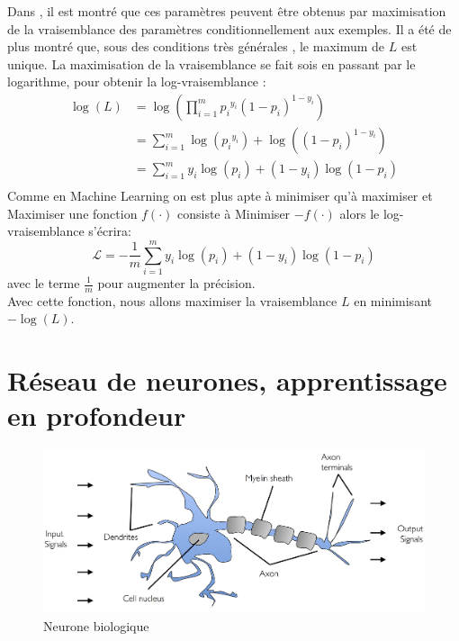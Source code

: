 	Dans \cite{antoine2018apprentissage}, il est montré que ces paramètres peuvent être obtenus par maximisation de la vraisemblance des paramètres conditionnellement aux exemples. Il a été de plus montré que, sous des conditions très générales \cite{sarkar2017practical}, le maximum de $L$ est unique.
	La maximisation de la vraisemblance se fait sois en passant par le logarithme, pour obtenir la log-vraisemblance :
	\begin{equation}
		\begin{split}
			\log(L)  & = \log(\prod_{i=1}^{m} {p_i}^{y_i} (1-p_i)^{1-y_i}) \\
			& =\sum_{i=1}^{m} \log( {p_i}^{y_i}) +\log((1-p_i)^{1-y_i})\\
			& =\sum_{i=1}^{m} {y_i}\log( {p_i}) +{(1-y_i)}\log(1-p_i)\\
		\end{split}
	\end{equation}
	Comme en Machine Learning on est plus apte à minimiser qu'à maximiser et Maximiser une fonction $f(\cdot)$ consiste à Minimiser $-f(\cdot)$ alors le log-vraisemblance s'écrira: 
	\begin{equation}\label{eq:log-likelyhood}
		\mathcal{L} = -\frac{1}{m}\sum_{i=1}^{m} {y_i}\log( {p_i}) +{(1-y_i)}\log(1-p_i)
	\end{equation}
	avec le terme $\frac{1}{m}$ pour augmenter la précision.\\
	Avec cette fonction, nous allons maximiser la vraisemblance $L$ en minimisant $-\log(L)$.	
		
	\pagebreak
	
\section{Réseau de neurones, apprentissage en profondeur}
	\begin{figure}[hth]%
		\centering
		\includegraphics[width=\textwidth]{images/neuron.png}
		\caption{Neurone biologique \cite{ml2008python}}
		\label{fig:bio_neuron}
	\end{figure}


